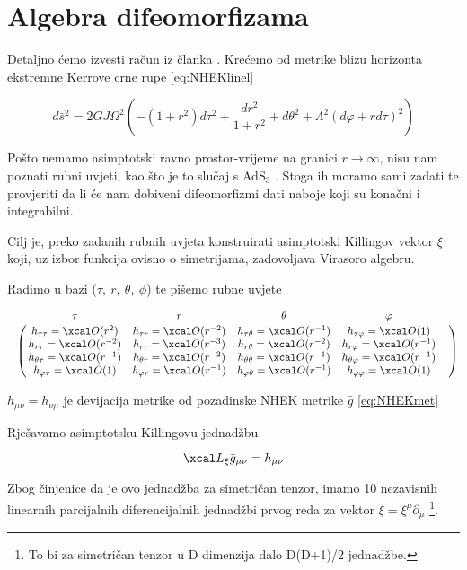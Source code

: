\section{Algebra difeomorfizama}\label{sec:Diff}

Detaljno ćemo izvesti račun iz članka \citep{Guica:2008mu}. Krećemo od metrike blizu horizonta ekstremne Kerrove crne rupe \eqref{eq:NHEKlinel}

\begin{equation*}
d\bar{s}^2=2GJ\Omega^2\left(-(1+r^2)d\tau^2+\frac{dr^2}{1+r^2}+d\theta^2+\Lambda^2(d\varphi+rd\tau)^2\right)
\end{equation*}

\noindent Pošto nemamo asimptotski ravno prostor-vrijeme na granici $r\to\infty$, nisu nam poznati rubni uvjeti, kao što je to slučaj s AdS${}_3$ \citep{Brown:1986nw}. Stoga ih moramo sami zadati te provjeriti da li će nam dobiveni difeomorfizmi dati naboje koji su konačni i integrabilni.

Cilj je, preko zadanih rubnih uvjeta konstruirati asimptotski Killingov vektor $\xi$ koji, uz izbor funkcija ovisno o simetrijama, zadovoljava Virasoro algebru.

\noindent Radimo u bazi ($\tau,\ r,\ \theta,\ \phi$) te pišemo rubne uvjete

\begin{equation}
\bordermatrix{~ & \tau & r & \theta & \varphi \cr
              & h_{\tau\tau}=\bigo(r^2) & h_{\tau r}=\bigo(r^{-2}) & h_{\tau\theta}=\bigo(r^{-1}) & h_{\tau\varphi}=\bigo(1) &\cr
              & h_{r\tau}=\bigo(r^{-2}) & h_{rr}=\bigo(r^{-3}) & h_{r\theta}=\bigo(r^{-2}) & h_{r\varphi}=\bigo(r^{-1}) & \cr
              & h_{\theta\tau}=\bigo(r^{-1}) & h_{\theta r}=\bigo(r^{-2}) & h_{\theta\theta}=\bigo(r^{-1}) & h_{\theta\varphi}=\bigo(r^{-1}) \cr
              & h_{\varphi\tau}=\bigo(1) & h_{\varphi r}=\bigo(r^{-1}) & h_{\varphi\theta}=\bigo(r^{-1}) & h_{\varphi\varphi}=\bigo(1) \cr}
\label{eq:Guicaru}
\end{equation}

\noindent $h_{\mu\nu}=h_{\nu\mu}$ je devijacija metrike od pozadinske NHEK metrike $\bar{g}$ \eqref{eq:NHEKmet}\medskip

\noindent Rješavamo asimptotsku Killingovu jednadžbu

\begin{equation}
\Lie_\xi\bar{g}_{\mu\nu}=h_{\mu\nu}
\end{equation}

\noindent Zbog činjenice da je ovo jednadžba za simetričan tenzor, imamo 10 nezavisnih linearnih parcijalnih diferencijalnih jednadžbi prvog reda za vektor $\xi=\xi^\mu\partial_\mu$ \footnote{To bi za simetričan tenzor u D dimenzija dalo D(D+1)/2 jednadžbe.}.

